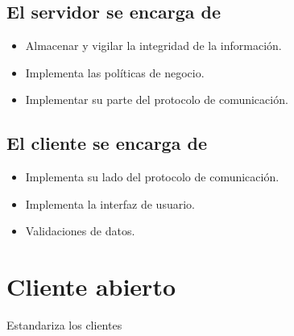 \subsection{El servidor se encarga de}
\begin{itemize}
	\item Almacenar y vigilar la integridad de la informaci\'{o}n.
	\item Implementa las pol\'{i}ticas de negocio.
	\item Implementar su parte del protocolo de comunicaci\'{o}n.
\end{itemize}

\subsection{El cliente se encarga de}
\begin{itemize}
	\item Implementa su lado del protocolo de comunicaci\'{o}n.
	\item Implementa la interfaz de usuario.
	\item Validaciones de datos.
\end{itemize}

\section{Cliente abierto}
Estandariza los clientes

